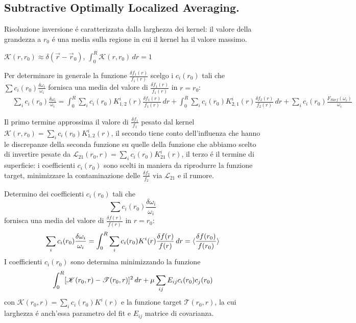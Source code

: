 \documentclass[../main.tex]{subfiles}
\begin{document}
\subsection{Subtractive Optimally Localized Averaging.}

\begin{workout}
Risoluzione inversione \'e caratterizzata dalla larghezza dei kernel: il valore della grandezza a $r_0$ \'e una media sulla regione in cui il kernel ha il valore massimo.
\end{workout}

\begin{workout}[OLA]
$\mathcal{K}(r,r_0)\approx\delta(\vec{r}-\vec{r}_0)$, $\int_0^R\mathcal{K}(r,r_0)\,dr=1$
\end{workout}

\begin{workout}

Per determinare in generale la funzione $\frac{\delta f_1(r)}{f_1(r)}$ scelgo i $c_i(r_0)$ tali che $\sum c_i(r_0)\frac{\delta\omega_i}{\omega_i}$ fornisca una media del valore di $\frac{\delta f_1(r)}{f_1(r)}$ in $r=r_0$:
\begin{align*}
&\sum_ic_i(r_0)\frac{\delta\omega_i}{\omega_i}=\int_0^R\sum_ic_i(r_0)K_{1,2}^i(r)\frac{\delta f_1(r)}{f_1(r)}\,dr+\int_0^R\sum_ic_i(r_0)K_{2,1}^i(r)\frac{\delta f_2(r)}{f_2(r)}\,dr+\sum_ic_i(r_0)\frac{F_{Surf}(\omega_i)}{\omega_i}
\end{align*}

Il primo termine approssima il valore di $\frac{\delta f_1}{f_1}$ pesato dal kernel $\mathcal{K}(r,r_0)=\sum_ic_i(r_0)K_{1,2}^i(r)$, il secondo tiene conto dell'influenza che hanno le discrepanze della seconda funzione su quelle della funzione che abbiamo scelto di invertire pesate da $\mathcal{L}_{21}(r_0,r)=\sum_ic_i(r_0)K_{21}^i(r)$, il terzo \'e il termine di superficie: i coefficienti $c_i(r_0)$ sono scelti in maniera da riprodurre la funzione target, minimizzare la contaminazione delle $\frac{\delta f_2}{f_2}$ via $\mathcal{L}_{21}$ e il rumore.

\end{workout}

Determino dei coefficienti $c_i(r_0)$ tali che \[\sum c_i(r_0)\frac{\delta\omega_i}{\omega_i}\] fornisca una media del valore di $\frac{\delta f(r)}{f(r)}$ in $r=r_0$:
\begin{equation}\label{eq:SOLAfmean}
\sum_ic_i(r_0)\frac{\delta\omega_i}{\omega_i}=\int_0^R\sum_ic_i(r_0)K^i(r)\frac{\delta f(r)}{f(r)}\,dr=\langle \frac{\delta f(r_0)}{f(r_0)} \rangle
\end{equation}
I coefficienti $c_i(r_0)$ sono determina minimizzando la funzione
\begin{equation}\label{eq:SOLAcir0min}
\int_0^R[\mathcal{K}(r_0,r)-\mathcal{T}(r_0,r)]^2\,dr+\mu\sum_{ij}E_{ij}c_i(r_0)c_j(r_0)\\
\end{equation}
con $\mathcal{K}(r_0,r)=\sum_ic_i(r_0)K^i(r)$ e la funzione target $\mathcal{T}(r_0,r)$, la cui larghezza \'e anch'essa parametro del fit e $E_{ij}$ matrice di covarianza.
\end{document}
